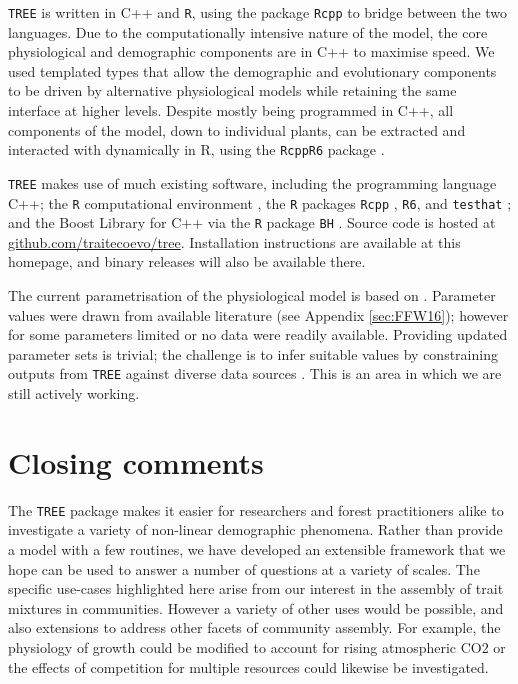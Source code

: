 \documentclass[a4paper,11pt]{article}
\begin{document}
\texttt{TREE} is written in C++ and \texttt{R}, using the package \texttt{Rcpp}
\citep{Eddelbuettel-2011, Eddelbuettel-2013} to bridge between the two
languages. Due to the computationally intensive nature of the model, the
core physiological and demographic components are in C++ to maximise
speed. We used templated types that allow the demographic and evolutionary
components to be driven by alternative physiological models while
retaining the same interface at higher levels. Despite mostly being
programmed in C++, all components of the model, down to individual
plants, can be extracted and interacted with dynamically in R, using the
\texttt{RcppR6} package \citep{RcppR6}.

\texttt{TREE} makes use of much existing software, including the programming
language C++; the \texttt{R} computational environment \citep{R-2015}, the \texttt{R}
packages \texttt{Rcpp} \citep{Eddelbuettel-2011, Eddelbuettel-2013},
\texttt{R6}\citep{Chang-2014}, and \texttt{testhat}
\citep{Wickham-2011}; and the Boost Library for C++
\citep{Schaling-2014} via the \texttt{R} package \texttt{BH}
\citep{Eddelbuettel-2015}. Source code is hosted at
\href{https://github.com/traitecoevo/tree}{github.com/traitecoevo/tree}.
Installation instructions are available at this homepage, and binary
releases will also be available there.

The current parametrisation of the physiological model is based on
\citet{Falster-2011}. Parameter values were drawn from available literature (see
Appendix \ref{sec:FFW16}); however for some parameters limited or no data were
readily available. Providing updated parameter sets is trivial; the challenge 
is to infer suitable values by constraining  outputs from \texttt{TREE} against diverse data sources
\citep{Lebauer-2012, Keenan-2013}. This is an area in which we are still actively working.

\section{Closing comments}

The \texttt{TREE} package makes it easier for researchers and forest practitioners
alike to investigate a variety of non-linear demographic phenomena.  Rather
than provide a model with a few routines, we have developed an extensible
framework that we hope can be used to answer a number of questions at a
variety of scales. The specific use-cases highlighted here arise from our
interest in the assembly of trait mixtures in communities. However a variety
of other uses would be possible, and also extensions to address other facets
of community assembly. For example,  the physiology of growth could be
modified to account for rising atmospheric CO2 or the effects of competition
for multiple resources could likewise be investigated.
\end{document}
